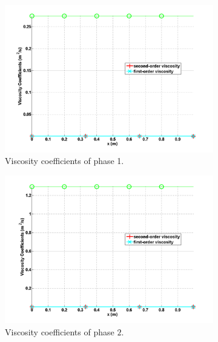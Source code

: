 %
\begin{figure}[H]
        \centering
        \begin{subfigure}[b]{0.495\textwidth}
                \centering
                \includegraphics[width=\textwidth]{figures/SEM/liquid_viscosity.png}
                \caption{Viscosity coefficients of phase 1.}
                \label{ig:visc-1-7-eqn-sect4}
        \end{subfigure}%
        \begin{subfigure}[b]{0.495\textwidth}
                \centering
                \includegraphics[width=\textwidth]{figures/SEM/vapor_viscosity.png}
                \caption{Viscosity coefficients of phase $2$.}
                \label{fig:visc-2-7-eqn-sect4}
        \end{subfigure}
        \caption{\label{fig:visc-7-sect4}}
\end{figure}
